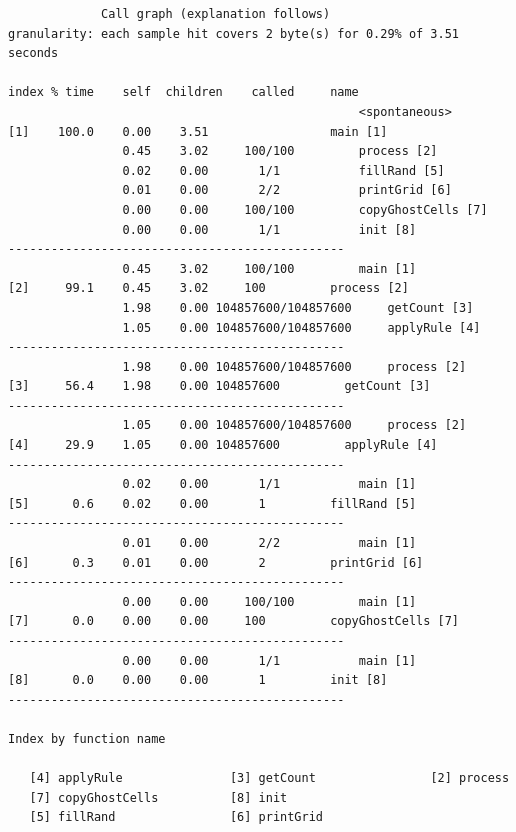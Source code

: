 \documentclass[11pt]{article} %
\begin{document}
\begin{verbatim}
		     Call graph (explanation follows)
granularity: each sample hit covers 2 byte(s) for 0.29% of 3.51 seconds

index % time    self  children    called     name
                                                 <spontaneous>
[1]    100.0    0.00    3.51                 main [1]
                0.45    3.02     100/100         process [2]
                0.02    0.00       1/1           fillRand [5]
                0.01    0.00       2/2           printGrid [6]
                0.00    0.00     100/100         copyGhostCells [7]
                0.00    0.00       1/1           init [8]
-----------------------------------------------
                0.45    3.02     100/100         main [1]
[2]     99.1    0.45    3.02     100         process [2]
                1.98    0.00 104857600/104857600     getCount [3]
                1.05    0.00 104857600/104857600     applyRule [4]
-----------------------------------------------
                1.98    0.00 104857600/104857600     process [2]
[3]     56.4    1.98    0.00 104857600         getCount [3]
-----------------------------------------------
                1.05    0.00 104857600/104857600     process [2]
[4]     29.9    1.05    0.00 104857600         applyRule [4]
-----------------------------------------------
                0.02    0.00       1/1           main [1]
[5]      0.6    0.02    0.00       1         fillRand [5]
-----------------------------------------------
                0.01    0.00       2/2           main [1]
[6]      0.3    0.01    0.00       2         printGrid [6]
-----------------------------------------------
                0.00    0.00     100/100         main [1]
[7]      0.0    0.00    0.00     100         copyGhostCells [7]
-----------------------------------------------
                0.00    0.00       1/1           main [1]
[8]      0.0    0.00    0.00       1         init [8]
-----------------------------------------------

Index by function name

   [4] applyRule               [3] getCount                [2] process
   [7] copyGhostCells          [8] init
   [5] fillRand                [6] printGrid

\end{verbatim}
\endgroup
\pagebreak
\end{document}
